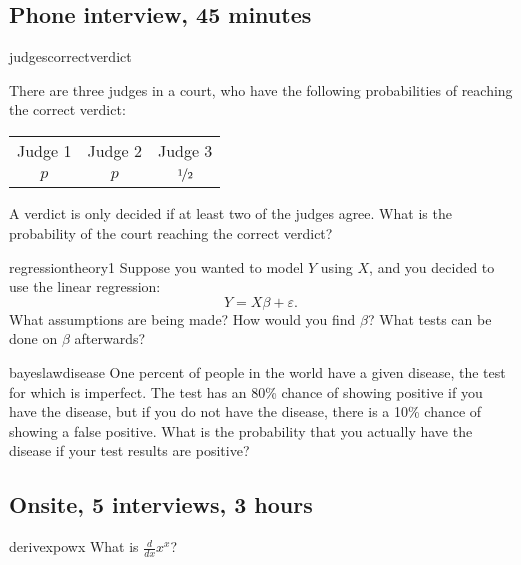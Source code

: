 \documentclass[a4paper]{article}
\begin{document}
\clearpage
\subsection{Phone interview, 45 minutes}
\begin{question}{judgescorrectverdict}

There are three judges in a court, who have the following probabilities of reaching the correct verdict:
\begin{center}
\begin{tabular}{ccc}
Judge 1 & Judge 2 & Judge 3 \\
$p$ &
$p$ &
$\nicefrac{1}{2}$ \\
\end{tabular}
\end{center}
A verdict is only decided if at least two of the judges agree.
What is the probability of the court reaching the correct verdict?
\end{question}


\begin{question}{regressiontheory1}
Suppose you wanted to model $Y$ using $X$, and you decided to use the linear regression:
\[
  Y = X \beta + \varepsilon
  \text{.}
\]
What assumptions are being made?
How would you find $\beta$?
What tests can be done on $\beta$ afterwards?
\end{question}


\begin{question}{bayeslawdisease}
One percent of people in the world have a given disease,
the test for which is imperfect.
The test has an 80\% chance of showing positive if you have the disease, but if you do not have the disease,
there is a 10\% chance of showing a false positive.
What is the probability that you actually have the disease if your test results are positive?
\end{question}

\clearpage




\clearpage
\subsection{Onsite, 5 interviews, 3 hours}
\begin{question}{derivexpowx}
What is $\frac{d}{dx}x^x$?
\end{question}
\end{document}
